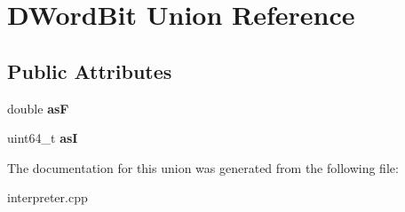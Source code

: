 \hypertarget{union_d_word_bit}{}\section{D\+Word\+Bit Union Reference}
\label{union_d_word_bit}
\subsection*{Public Attributes}
\begin{DoxyCompactItemize}
\item 
double {\bfseries asF}\hypertarget{union_d_word_bit_acd88364137f2798c4480d026d86633df}{}\label{union_d_word_bit_acd88364137f2798c4480d026d86633df}

\item 
uint64\+\_\+t {\bfseries asI}\hypertarget{union_d_word_bit_ac2b7b7a4474de9c191472cc99706abd8}{}\label{union_d_word_bit_ac2b7b7a4474de9c191472cc99706abd8}

\end{DoxyCompactItemize}


The documentation for this union was generated from the following file\+:\begin{DoxyCompactItemize}
\item 
interpreter.\+cpp\end{DoxyCompactItemize}
